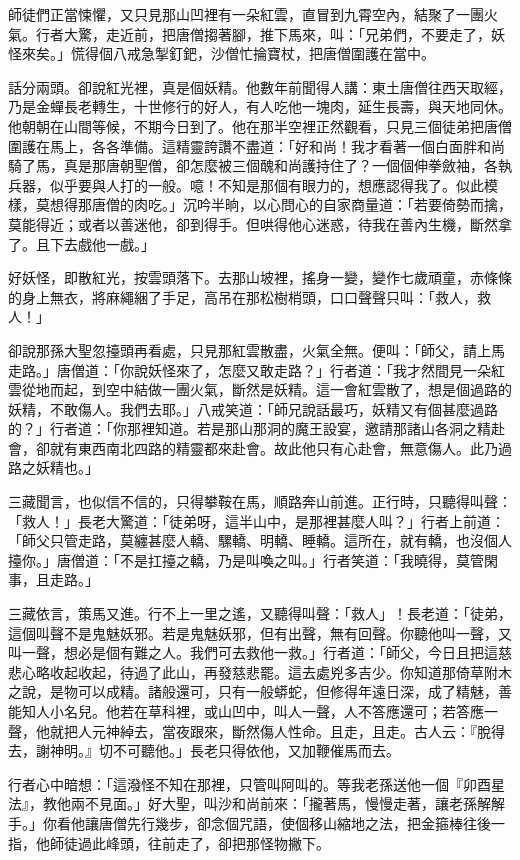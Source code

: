 師徒們正當悚懼，又只見那山凹裡有一朵紅雲，直冒到九霄空內，結聚了一團火氣。行者大驚，走近前，把唐僧搊著腳，推下馬來，叫：「兄弟們，不要走了，妖怪來矣。」慌得個八戒急掣釘鈀，沙僧忙掄寶杖，把唐僧圍護在當中。

話分兩頭。卻說紅光裡，真是個妖精。他數年前聞得人講：東土唐僧往西天取經，乃是金蟬長老轉生，十世修行的好人，有人吃他一塊肉，延生長壽，與天地同休。他朝朝在山間等候，不期今日到了。他在那半空裡正然觀看，只見三個徒弟把唐僧圍護在馬上，各各準備。這精靈誇讚不盡道：「好和尚！我才看著一個白面胖和尚騎了馬，真是那唐朝聖僧，卻怎麼被三個醜和尚護持住了？一個個伸拳斂袖，各執兵器，似乎要與人打的一般。噫！不知是那個有眼力的，想應認得我了。似此模樣，莫想得那唐僧的肉吃。」沉吟半晌，以心問心的自家商量道：「若要倚勢而擒，莫能得近；或者以善迷他，卻到得手。但哄得他心迷惑，待我在善內生機，斷然拿了。且下去戲他一戲。」

好妖怪，即散紅光，按雲頭落下。去那山坡裡，搖身一變，變作七歲頑童，赤條條的身上無衣，將麻繩綑了手足，高吊在那松樹梢頭，口口聲聲只叫：「救人，救人！」

卻說那孫大聖忽擡頭再看處，只見那紅雲散盡，火氣全無。便叫：「師父，請上馬走路。」唐僧道：「你說妖怪來了，怎麼又敢走路？」行者道：「我才然間見一朵紅雲從地而起，到空中結做一團火氣，斷然是妖精。這一會紅雲散了，想是個過路的妖精，不敢傷人。我們去耶。」八戒笑道：「師兄說話最巧，妖精又有個甚麼過路的？」行者道：「你那裡知道。若是那山那洞的魔王設宴，邀請那諸山各洞之精赴會，卻就有東西南北四路的精靈都來赴會。故此他只有心赴會，無意傷人。此乃過路之妖精也。」

三藏聞言，也似信不信的，只得攀鞍在馬，順路奔山前進。正行時，只聽得叫聲：「救人！」長老大驚道：「徒弟呀，這半山中，是那裡甚麼人叫？」行者上前道：「師父只管走路，莫纏甚麼人轎、騾轎、明轎、睡轎。這所在，就有轎，也沒個人擡你。」唐僧道：「不是扛擡之轎，乃是叫喚之叫。」行者笑道：「我曉得，莫管閑事，且走路。」

三藏依言，策馬又進。行不上一里之遙，又聽得叫聲：「救人」！長老道：「徒弟，這個叫聲不是鬼魅妖邪。若是鬼魅妖邪，但有出聲，無有回聲。你聽他叫一聲，又叫一聲，想必是個有難之人。我們可去救他一救。」行者道：「師父，今日且把這慈悲心略收起收起，待過了此山，再發慈悲罷。這去處兇多吉少。你知道那倚草附木之說，是物可以成精。諸般還可，只有一般蟒蛇，但修得年遠日深，成了精魅，善能知人小名兒。他若在草科裡，或山凹中，叫人一聲，人不答應還可；若答應一聲，他就把人元神綽去，當夜跟來，斷然傷人性命。且走，且走。古人云：『脫得去，謝神明。』切不可聽他。」長老只得依他，又加鞭催馬而去。

行者心中暗想：「這潑怪不知在那裡，只管叫阿叫的。等我老孫送他一個『卯酉星法』，教他兩不見面。」好大聖，叫沙和尚前來：「攏著馬，慢慢走著，讓老孫解解手。」你看他讓唐僧先行幾步，卻念個咒語，使個移山縮地之法，把金箍棒往後一指，他師徒過此峰頭，往前走了，卻把那怪物撇下。

